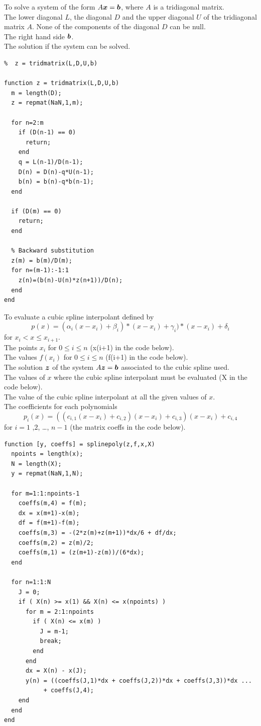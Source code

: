 \begin{code}
To solve a system of the form $A\bm{x} = \bm{b}$, where $A$ is a
tridiagonal matrix.\\
 The lower diagonal $L$, the diagonal $D$ and the upper
diagonal $U$ of the tridiagonal matrix $A$.  None of the components of
the diagonal $D$ can be null.\\
The right hand side $\bm{b}$.\\
 The solution if the system can be solved.
\small
\begin{verbatim}
%  z = tridmatrix(L,D,U,b)

function z = tridmatrix(L,D,U,b)
  m = length(D);
  z = repmat(NaN,1,m);

  for n=2:m
    if (D(n-1) == 0)
      return;
    end
    q = L(n-1)/D(n-1);
    D(n) = D(n)-q*U(n-1);
    b(n) = b(n)-q*b(n-1);
  end

  if (D(m) == 0)
    return;
  end

  % Backward substitution
  z(m) = b(m)/D(m);
  for n=(m-1):-1:1
    z(n)=(b(n)-U(n)*z(n+1))/D(n);
  end
end
\end{verbatim}
\end{code}

\begin{code}
To evaluate a cubic spline interpolant defined by
\[
  p(x) = (\alpha_i(x-x_i) + \beta_i)*(x-x_i) + \gamma_i)*(x-x_i) + \delta_i
\]
for $x_i < x \leq x_{i+1}$.\\
 The points $x_i$ for $0 \leq i \leq n$ (x(i+1) in the
code below).\\
The values $f(x_i)$ for $0 \leq i \leq n$ (f(i+1) in the code
below).\\
The solution $\bm{z}$ of the system $A \bm{z} = \bm{b}$ associated
to the cubic spline used.\\
The values of $x$ where the cubic spline interpolant must
be evaluated (X in the code below).\\
 The value of the cubic spline interpolant at all the
given values of $x$.\\
The coefficients for each polynomials
\[
  p_i(x) = ((c_{i,1} (x-x_i) + c_{i,2})(x-x_i) + c_{i,3})(x-x_i) + c_{i,4}
\]
for $i=1$ ,$2$, \ldots, $n-1$ (the matrix coeffs in the code below).
\small
\begin{verbatim}
function [y, coeffs] = splinepoly(z,f,x,X)
  npoints = length(x);
  N = length(X);
  y = repmat(NaN,1,N);

  for m=1:1:npoints-1
    coeffs(m,4) = f(m);
    dx = x(m+1)-x(m);
    df = f(m+1)-f(m);
    coeffs(m,3) = -(2*z(m)+z(m+1))*dx/6 + df/dx;
    coeffs(m,2) = z(m)/2;
    coeffs(m,1) = (z(m+1)-z(m))/(6*dx);
  end

  for n=1:1:N
    J = 0;
    if ( X(n) >= x(1) && X(n) <= x(npoints) )
      for m = 2:1:npoints
        if ( X(n) <= x(m) )
          J = m-1;
          break;
        end
      end
      dx = X(n) - x(J);
      y(n) = ((coeffs(J,1)*dx + coeffs(J,2))*dx + coeffs(J,3))*dx ...
           + coeffs(J,4);
    end
  end
end
\end{verbatim}
\end{code}

